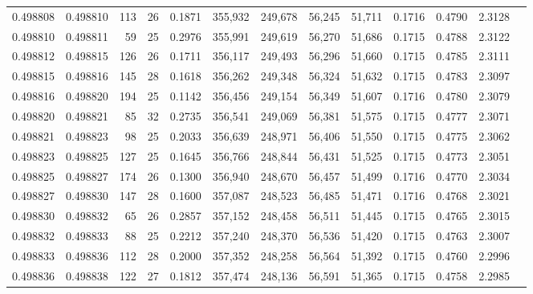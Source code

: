 \begin{tabular}{rrrrrrrrrrrrr}
0.498808 & 0.498810 & 113 &  26 &                                     0.1871 & 355,932 & 249,678 &  56,245 &  51,711 & 0.1716 & 0.4790 & 2.3128 \\
0.498810 & 0.498811 &  59 &  25 &                                     0.2976 & 355,991 & 249,619 &  56,270 &  51,686 & 0.1715 & 0.4788 & 2.3122 \\
0.498812 & 0.498815 & 126 &  26 &                                     0.1711 & 356,117 & 249,493 &  56,296 &  51,660 & 0.1715 & 0.4785 & 2.3111 \\
0.498815 & 0.498816 & 145 &  28 &                                     0.1618 & 356,262 & 249,348 &  56,324 &  51,632 & 0.1715 & 0.4783 & 2.3097 \\
0.498816 & 0.498820 & 194 &  25 &                                     0.1142 & 356,456 & 249,154 &  56,349 &  51,607 & 0.1716 & 0.4780 & 2.3079 \\
0.498820 & 0.498821 &  85 &  32 &                                     0.2735 & 356,541 & 249,069 &  56,381 &  51,575 & 0.1715 & 0.4777 & 2.3071 \\
0.498821 & 0.498823 &  98 &  25 &                                     0.2033 & 356,639 & 248,971 &  56,406 &  51,550 & 0.1715 & 0.4775 & 2.3062 \\
0.498823 & 0.498825 & 127 &  25 &                                     0.1645 & 356,766 & 248,844 &  56,431 &  51,525 & 0.1715 & 0.4773 & 2.3051 \\
0.498825 & 0.498827 & 174 &  26 &                                     0.1300 & 356,940 & 248,670 &  56,457 &  51,499 & 0.1716 & 0.4770 & 2.3034 \\
0.498827 & 0.498830 & 147 &  28 &                                     0.1600 & 357,087 & 248,523 &  56,485 &  51,471 & 0.1716 & 0.4768 & 2.3021 \\
0.498830 & 0.498832 &  65 &  26 &                                     0.2857 & 357,152 & 248,458 &  56,511 &  51,445 & 0.1715 & 0.4765 & 2.3015 \\
0.498832 & 0.498833 &  88 &  25 &                                     0.2212 & 357,240 & 248,370 &  56,536 &  51,420 & 0.1715 & 0.4763 & 2.3007 \\
0.498833 & 0.498836 & 112 &  28 &                                     0.2000 & 357,352 & 248,258 &  56,564 &  51,392 & 0.1715 & 0.4760 & 2.2996 \\
0.498836 & 0.498838 & 122 &  27 &                                     0.1812 & 357,474 & 248,136 &  56,591 &  51,365 & 0.1715 & 0.4758 & 2.2985 \\

\end{tabular}
